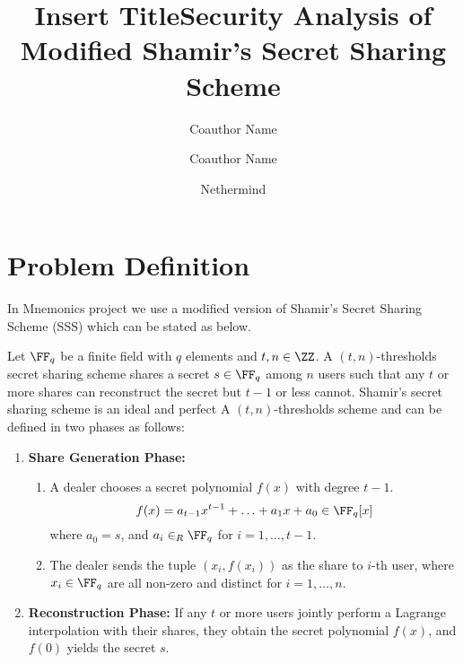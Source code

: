 \documentclass[envcountsame,runningheads,notitlepage]{llncs}
\title{Insert Title}
\date{}
\author{
	Coauthor Name\inst{1} \and
	Coauthor Name\inst{2}
}%
\institute{Coauthor University\\
	\href{mailto:mail@mail.com}{mail@mail.com} \and
	Coauthor University\\
	\href{mailto:mail@mail.com}{mail@mail.com}
}  %
\author{}
\institute{}
\begin{document}
	\title{Security Analysis of Modified Shamir's Secret Sharing Scheme}
	
	\author{Nethermind}
	\maketitle
	
	\section{Problem Definition}
	In Mnemonics project we use a modified version of Shamir's Secret Sharing Scheme (SSS) \cite{Shamir79} which can be stated as below. 
	
	\begin{definition}\label{def:shamir}
		Let $\FF_q$ be a finite field with $q$ elements and $t,n \in \ZZ$. A $(t, n)$-thresholds secret sharing scheme shares a secret $s \in \FF_q$ among $n$ users such that any $t$ or more shares can reconstruct the secret but $t-1$ or less cannot. Shamir's secret sharing scheme is an ideal and perfect A $(t, n)$-thresholds scheme and can be defined in two phases as follows:
		
		\begin{enumerate}
			\item \textbf{Share Generation Phase:} 
			\begin{enumerate}
				\item A dealer chooses a secret polynomial $f (x)$ with degree $t - 1$.
				\begin{equation*}
				f (x) = a_{t-1}x^{t-1} + \ldots + a_1x + a_0 \in \FF_q [x]
				\end{equation*}
				where $a_0 = s$, and $a_i \in_{R} \FF_q$ for $i = 1, \ldots, t-1$. 
				\item The dealer sends the tuple $(x_{i}, f (x_{i}))$ as the share to $i$-th user, where $x_{i} \in \FF_q$ are all non-zero and distinct for $i = 1, \ldots, n$. 
			\end{enumerate}
			
			\item \textbf{Reconstruction Phase:} 
			If any $t$ or more users jointly perform a Lagrange interpolation with their shares, they obtain the secret polynomial $f (x)$, and $f(0)$ yields the secret $s$.
		\end{enumerate}
	\end{definition}
	
\end{document}
